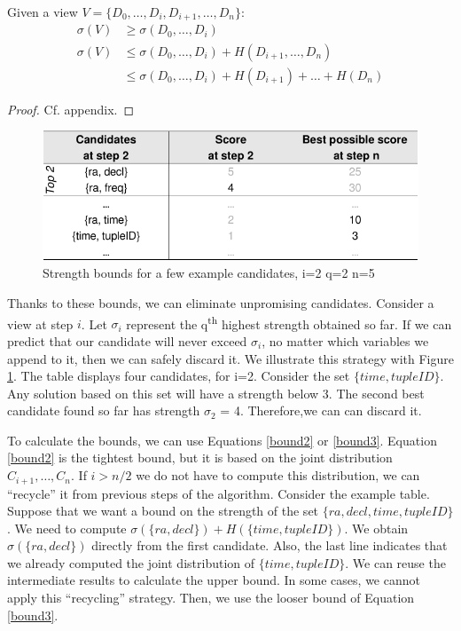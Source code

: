 \begin{lemma}
\label{lem:bounds}
Given a view $V = \{D_0, \ldots , D_i, D_{i+1}, \ldots, D_n\}$:
\begin{align}
    \sigma(V)  & \geq \sigma(D_0, \ldots , D_i) \label{bound1}\\
     \sigma(V) & \leq \sigma(D_0, \ldots , D_i) + H(D_{i+1}, \ldots, D_n) \label{bound2}\\
               & \leq \sigma(D_0, \ldots , D_i) + H(D_{i+1}) + \ldots + H(D_n) \label{bound3}
\end{align}
\end{lemma}

\begin{proof}
Cf. appendix.
\end{proof}

\begin{figure}[t!]
\centering
\includegraphics[width=\columnwidth]{images/pruning_example}
\caption{Strength bounds for a few example candidates, i=2 q=2 n=5}
\label{pruning}
\end{figure}

Thanks to these bounds, we can eliminate unpromising candidates.  Consider a
view at step $i$.  Let $\sigma_i$ represent the q\textsuperscript{th} highest
strength obtained so far. If we can predict that our candidate will never
exceed $\sigma_i$, no matter which variables we append to it, then we can
safely discard it. We illustrate this
strategy with Figure \ref{pruning}. The table displays four candidates, for
i=2. Consider the set $\{time, tupleID\}$. Any solution based on this set
will have a strength below 3. The second best candidate found so far has
strength $\sigma_2$ = 4. Therefore,we can can discard it.

To calculate the bounds, we can use Equations \ref{bound2} or \ref{bound3}.
Equation \ref{bound2} is the tightest bound, but it is based on the joint
distribution $C_{i+1}, \ldots, C_n$. If $i>n/2$ we do not have to
compute this distribution, we can ``recycle'' it from previous steps of the
algorithm.  Consider the example table.  Suppose that we want a bound on the
strength of the set $\{ra, decl, time, tupleID\}$. We need to compute
$\sigma(\{ra, decl\}) + H(\{time, tupleID\})$. We obtain $\sigma(\{ra, decl\})$
directly from the first candidate. Also, the last line indicates that we
already computed the joint distribution of $\{time, tupleID\}$. We can reuse
the intermediate results to calculate the upper bound. In some cases, we cannot
apply this ``recycling'' strategy. Then, we use the looser bound of
Equation \ref{bound3}.


